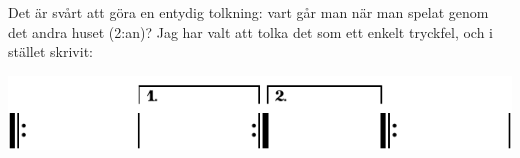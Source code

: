 {Det är svårt att göra en entydig tolkning: vart går man när man spelat genom det
andra \guillemotright{}huset\guillemotright{} (2:an)? Jag har valt att tolka det som ett enkelt tryckfel, och
i stället skrivit:

\vspace{3mm}
\includegraphics{include/snippets/repriser-ratt-crop.pdf}

}
\restoregeometry
\fancyhfoffset[E,O]{0pt}
